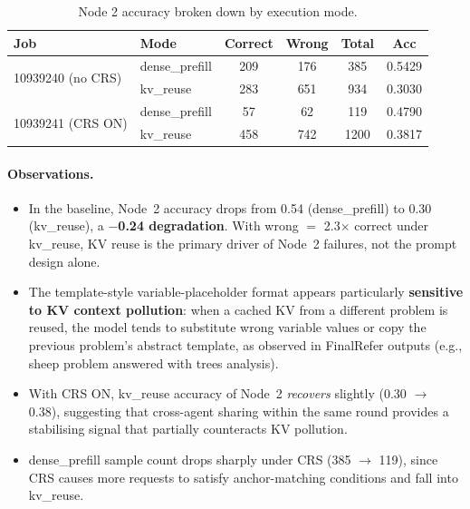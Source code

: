 \documentclass[11pt]{article}
\begin{document}
\begin{table}[h]
\centering
\caption{Node 2 accuracy broken down by execution mode.}
\label{tab:node2_mode}
\begin{tabular}{llcccc}
\toprule
\textbf{Job} & \textbf{Mode} & \textbf{Correct} & \textbf{Wrong} & \textbf{Total} & \textbf{Acc} \\
\midrule
\multirow{2}{*}{10939240 (no CRS)} & dense\_prefill & 209 & 176 & 385  & 0.5429 \\
                                   & kv\_reuse      & 283 & 651 & 934  & 0.3030 \\
\midrule
\multirow{2}{*}{10939241 (CRS ON)} & dense\_prefill &  57 &  62 & 119  & 0.4790 \\
                                   & kv\_reuse      & 458 & 742 & 1200 & 0.3817 \\
\bottomrule
\end{tabular}
\end{table}

\paragraph{Observations.}
\begin{itemize}
  \item In the baseline, Node~2 accuracy drops from 0.54 (dense\_prefill) to
        0.30 (kv\_reuse), a \textbf{$-$0.24 degradation}.  With wrong $=$ 2.3$\times$
        correct under kv\_reuse, KV reuse is the primary driver of Node~2
        failures, not the prompt design alone.
  \item The template-style variable-placeholder format appears particularly
        \textbf{sensitive to KV context pollution}: when a cached KV from a
        different problem is reused, the model tends to substitute wrong variable
        values or copy the previous problem's abstract template, as observed in
        FinalRefer outputs (e.g., sheep problem answered with trees analysis).
  \item With CRS ON, kv\_reuse accuracy of Node~2 \emph{recovers} slightly
        (0.30 $\to$ 0.38), suggesting that cross-agent sharing within the same
        round provides a stabilising signal that partially counteracts KV
        pollution.
  \item dense\_prefill sample count drops sharply under CRS (385 $\to$ 119),
        since CRS causes more requests to satisfy anchor-matching conditions
        and fall into kv\_reuse.
\end{itemize}
\end{document}

